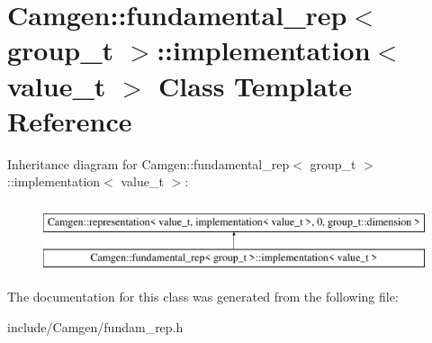 \hypertarget{a00287}{\section{Camgen\-:\-:fundamental\-\_\-rep$<$ group\-\_\-t $>$\-:\-:implementation$<$ value\-\_\-t $>$ Class Template Reference}
\label{a00287}
}
Inheritance diagram for Camgen\-:\-:fundamental\-\_\-rep$<$ group\-\_\-t $>$\-:\-:implementation$<$ value\-\_\-t $>$\-:\begin{figure}[H]
\begin{center}
\leavevmode
\includegraphics[height=2.000000cm]{a00287}
\end{center}
\end{figure}


The documentation for this class was generated from the following file\-:\begin{DoxyCompactItemize}
\item 
include/\-Camgen/fundam\-\_\-rep.\-h\end{DoxyCompactItemize}
